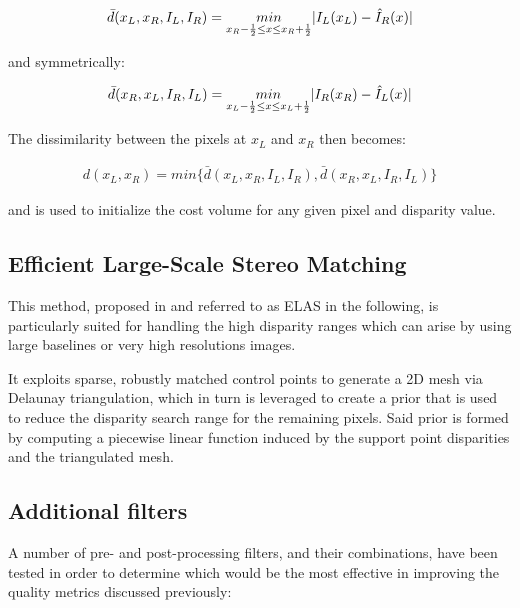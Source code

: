 \begin{align}\label{eq:cp03_birchfield_tomasi_l_in_r}
\bar{d}(x_L, x_R, I_L, I_R) = \underset{x_R - {1 \over 2} \leq x \leq x_R + {1 \over 2}}{min} | I_L(x_L) - \hat{I}_R(x)|
\end{align}

and symmetrically:

\begin{align}\label{eq:cp03_birchfield_tomasi_r_in_l}
\bar{d}(x_R, x_L, I_R, I_L) = \underset{x_L - {1 \over 2} \leq x \leq x_L + {1 \over 2}}{min} | I_R(x_R) - \hat{I}_L(x)|
\end{align}

The dissimilarity between the pixels at $x_L$ and $x_R$ then becomes:

\begin{align}\label{eq:cp03_birchfield_tomasi}
d(x_L, x_R) = min \{ \bar{d}(x_L, x_R, I_L, I_R), \bar{d}(x_R, x_L, I_R, I_L) \}
\end{align}

and is used to initialize the cost volume for any given pixel and disparity value.


\subsection{Efficient Large-Scale Stereo Matching}\label{ch:chapter03_03_02}

This method, proposed in \cite{Geiger2011} and referred to as ELAS in the following, is particularly suited for handling the high disparity ranges which can arise by using large baselines or very high resolutions images.

It exploits sparse, robustly matched control points to generate a 2D mesh via Delaunay triangulation, which in turn is leveraged to create a prior that is used to reduce the disparity search range for the remaining pixels. Said prior is formed by computing a piecewise linear function induced by the support point disparities and the triangulated mesh.

\subsection{Additional filters}\label{ch:chapter03_03_03}

A number of pre- and post-processing filters, and their combinations, have been tested in order to determine which would be the most effective in improving the quality metrics discussed previously:

